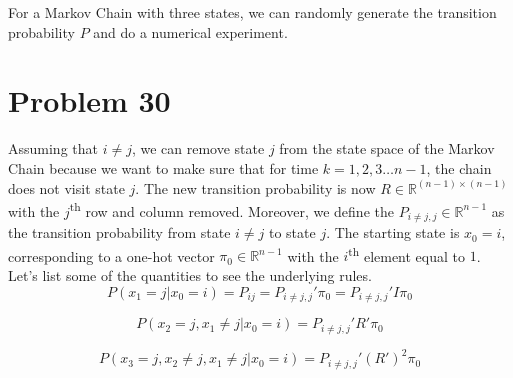 \documentclass[a4paper, 11pt]{article}
\begin{document}
For a Markov Chain with three states, we can randomly generate the transition probability $P$ and do a numerical experiment. 

\section*{Problem 30}

Assuming that $i \neq j$, we can remove state $j$ from the state space of the Markov Chain because we want to make sure that for time $k = 1, 2, 3 \dots n-1$, the chain does not visit state $j$. The new transition probability is now $R \in \mathbb{R}^{(n-1)\times (n-1)}$ with the $j$\textsuperscript{th} row and column removed. Moreover, we define the $P_{i\neq j, j} \in \mathbb{R}^{n-1}$ as the transition probability from state $i\neq j$ to state $j$. The starting state is $x_0 = i$, corresponding to a one-hot vector $\pi_0 \in \mathbb{R}^{n-1}$ with the $i$\textsuperscript{th} element equal to $1$. Let's list some of the quantities to see the underlying rules. 
\begin{equation}
P(x_1 = j | x_0 = i) = P_{ij} = P_{i\neq j, j}' \pi_0 = P_{i\neq j, j}' I \pi_0 
\end{equation}

\begin{equation}
P(x_2 = j, x_1 \neq j | x_0 = i) = P_{i\neq j, j}' R' \pi_0
\end{equation}

\begin{equation}
P(x_3 = j, x_2 \neq j, x_1 \neq j | x_0 = i) = P_{i\neq j, j}' (R')^2 \pi_0
\end{equation}
\end{document}
